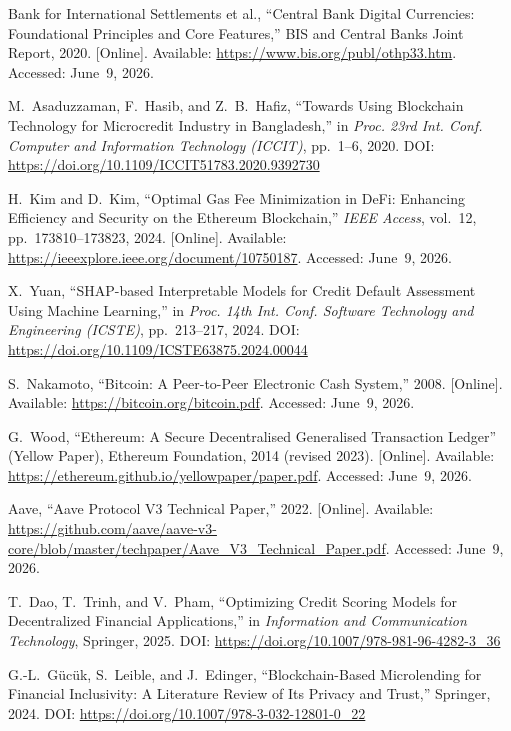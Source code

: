 \documentclass[12pt,a4paper]{report}
\begin{document}
{\begin{enumerate}[label={[\arabic*]}]
\item Bank for International Settlements et al., ``Central Bank Digital Currencies: Foundational Principles and Core Features,'' BIS and Central Banks Joint Report, 2020. [Online]. Available: \url{https://www.bis.org/publ/othp33.htm}. Accessed: June~9, 2026.
\item M.~Asaduzzaman, F.~Hasib, and Z.~B.~Hafiz, ``Towards Using Blockchain Technology for Microcredit Industry in Bangladesh,'' in \textit{Proc. 23rd Int. Conf. Computer and Information Technology (ICCIT)}, pp.~1--6, 2020. DOI: \url{https://doi.org/10.1109/ICCIT51783.2020.9392730}
\item H.~Kim and D.~Kim, ``Optimal Gas Fee Minimization in DeFi: Enhancing Efficiency and Security on the Ethereum Blockchain,'' \textit{IEEE Access}, vol.~12, pp.~173810--173823, 2024. [Online]. Available: \url{https://ieeexplore.ieee.org/document/10750187}. Accessed: June~9, 2026.
\item X.~Yuan, ``SHAP-based Interpretable Models for Credit Default Assessment Using Machine Learning,'' in \textit{Proc. 14th Int. Conf. Software Technology and Engineering (ICSTE)}, pp.~213--217, 2024. DOI: \url{https://doi.org/10.1109/ICSTE63875.2024.00044}
\item S.~Nakamoto, ``Bitcoin: A Peer-to-Peer Electronic Cash System,'' 2008. [Online]. Available: \url{https://bitcoin.org/bitcoin.pdf}. Accessed: June~9, 2026.

\item G.~Wood, ``Ethereum: A Secure Decentralised Generalised Transaction Ledger'' (Yellow Paper), Ethereum Foundation, 2014 (revised 2023). [Online]. Available: \url{https://ethereum.github.io/yellowpaper/paper.pdf}. Accessed: June~9, 2026.

\item Aave, ``Aave Protocol V3 Technical Paper,'' 2022. [Online]. Available: \url{https://github.com/aave/aave-v3-core/blob/master/techpaper/Aave_V3_Technical_Paper.pdf}. Accessed: June~9, 2026.

\item T.~Dao, T.~Trinh, and V.~Pham, ``Optimizing Credit Scoring Models for Decentralized Financial Applications,'' in \textit{Information and Communication Technology}, Springer, 2025. DOI: \url{https://doi.org/10.1007/978-981-96-4282-3_36}

\item G.-L.~G\"{u}c\"{u}k, S.~Leible, and J.~Edinger, ``Blockchain-Based Microlending for Financial Inclusivity: A Literature Review of Its Privacy and Trust,'' Springer, 2024. DOI: \url{https://doi.org/10.1007/978-3-032-12801-0_22}



\end{enumerate}}
\end{document}
